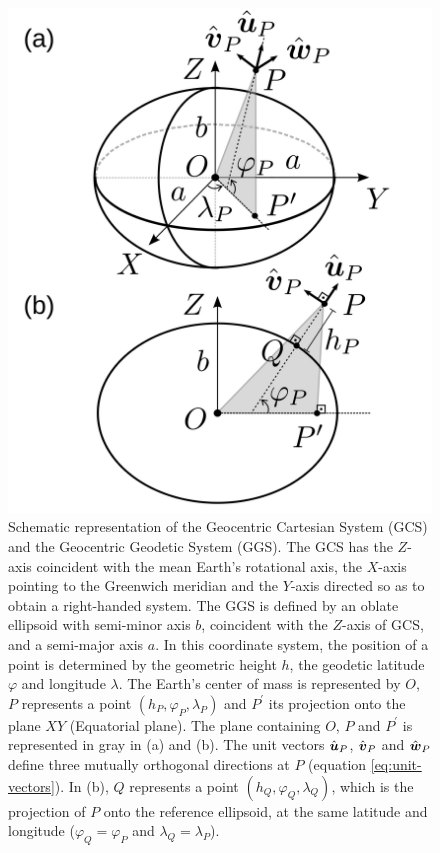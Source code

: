 \documentclass[extra]{gji}
\begin{document}
\begin{figure}
    \includegraphics{figures/cartesian-geodetic-systems.png}
    \caption{Schematic representation of the Geocentric Cartesian System (GCS) and the Geocentric Geodetic System (GGS). The GCS has the $Z$-axis coincident with the mean Earth's rotational axis,
    the $X$-axis pointing to the Greenwich meridian and the $Y$-axis
    directed so as to obtain a right-handed system. The GGS is      defined by an oblate ellipsoid with semi-minor axis $b$, 
    coincident with the $Z$-axis of GCS, and a semi-major
    axis $a$. In this coordinate system, the position of a point is
    determined by the geometric height $h$, the geodetic latitude 
    $\varphi$ and longitude $\lambda$. 
    The Earth's center of mass is represented 
    by $O$, $P$ represents a point $(h_{P}, \varphi_{P}, \lambda_{P})$ and $P^{\prime}$ its projection onto the plane $XY$ 
    (Equatorial plane). The plane containing $O$, $P$ and 
    $P^{\prime}$ is represented in gray in (a) and (b). 
    The unit vectors $\hat{\mitbf{u}}_{P}$, $\hat{\mitbf{v}}_{P}$ and 
    $\hat{\mitbf{w}}_{P}$ define three mutually orthogonal 
    directions at $P$ (equation \ref{eq:unit-vectors}).
    In (b), $Q$ represents a point $(h_{Q}, \varphi_{Q}, \lambda_{Q})$,
    which is the projection of $P$ onto the reference ellipsoid, at
    the same latitude and longitude ($\varphi_{Q} = \varphi_{P}$ and $\lambda_{Q} = \lambda_{P}$).}
  \label{fig:fig1}
\end{figure}
\end{document}

